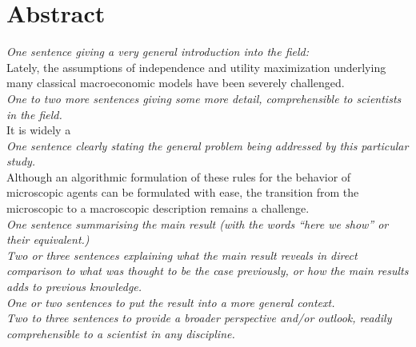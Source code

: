 \section{Abstract}

\emph{One sentence giving a very general introduction into the field:} \\
Lately, the assumptions of independence and utility maximization underlying many classical macroeconomic models have been severely challenged.  \\


\emph{One to two more sentences giving some more detail, comprehensible to scientists in the field.} \\
It is widely a  \\ 

\emph{One sentence clearly stating the general problem being addressed by this particular study.} \\
Although an algorithmic formulation of these rules for the behavior of microscopic agents can be formulated with ease, the transition from the microscopic to a macroscopic description remains a challenge. \\

\emph{One sentence summarising the main result (with the words ``here we show'' or their equivalent.)} \\

\emph{Two or three sentences explaining what the main result reveals in direct comparison to what was thought to be the case previously, or how the main results adds to previous knowledge.} \\

\emph{One or two sentences to put the result into a more general context.} \\

\emph{Two to three sentences to provide a broader perspective and/or outlook, readily comprehensible to a scientist in any discipline.}
